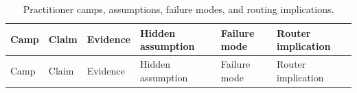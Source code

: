 \documentclass[
  11pt,
  letterpaper,
  numbers=noendperiod,
  parskip=half]{scrartcl}
\begin{document}
\begin{longtable}[]{@{}
  >{\raggedright\arraybackslash}p{}
  >{\raggedright\arraybackslash}p{}
  >{\raggedright\arraybackslash}p{}
  >{\raggedright\arraybackslash}p{}
  >{\raggedright\arraybackslash}p{}
  >{\raggedright\arraybackslash}p{}@{}}
\caption{Practitioner camps, assumptions, failure modes, and routing
implications.}\label{tbl-camps}\tabularnewline
\toprule\noalign{}
\begin{minipage}[b]{\linewidth}\raggedright
Camp
\end{minipage} & \begin{minipage}[b]{\linewidth}\raggedright
Claim
\end{minipage} & \begin{minipage}[b]{\linewidth}\raggedright
Evidence
\end{minipage} & \begin{minipage}[b]{\linewidth}\raggedright
Hidden assumption
\end{minipage} & \begin{minipage}[b]{\linewidth}\raggedright
Failure mode
\end{minipage} & \begin{minipage}[b]{\linewidth}\raggedright
Router implication
\end{minipage} \\
\midrule\noalign{}
\endfirsthead
\toprule\noalign{}
\begin{minipage}[b]{\linewidth}\raggedright
Camp
\end{minipage} & \begin{minipage}[b]{\linewidth}\raggedright
Claim
\end{minipage} & \begin{minipage}[b]{\linewidth}\raggedright
Evidence
\end{minipage} & \begin{minipage}[b]{\linewidth}\raggedright
Hidden assumption
\end{minipage} & \begin{minipage}[b]{\linewidth}\raggedright
Failure mode
\end{minipage} & \begin{minipage}[b]{\linewidth}\raggedright
Router implication
\end{minipage} \\

\end{longtable}
\end{document}
